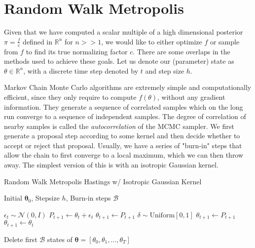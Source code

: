 \section{Random Walk Metropolis}

    Given that we have computed a scalar multiple of a high dimensional posterior $\pi = \frac{f}{c}$ defined in $\mathbb{R}^n$ for $n >> 1$, we would like to either optimize $f$ or sample from $f$ to find its true normalizing factor $c$. There are some overlaps in the methods used to achieve these goals. Let us denote our (parameter) state as $\theta \in \mathbb{R}^n$, with a discrete time step denoted by $t$ and step size $h$. 

    Markov Chain Monte Carlo algorithms are extremely simple and computationally efficient, since they only require to compute $f(\theta)$, without any gradient information. They generate a sequence of correlated samples which on the long run converge to a sequence of independent samples. The degree of correlation of nearby samples is called the \textit{autocorrelation} of the MCMC sampler. We first generate a proposal step according to some kernel and then decide whether to accept or reject that proposal. Usually, we have a series of "burn-in" steps that allow the chain to first converge to a local maximum, which we can then throw away. The simplest version of this is with an isotropic Gaussian kernel. 

    \begin{algorithm}
      \caption{Random Walk Metropolis Hastings w/ Isotropic Gaussian Kernel}\label{alg:metropolis_gaussian}
      \begin{algorithmic}

      \Require Initial $\boldsymbol{\theta}_0$, Stepsize $h$, Burn-in steps $\mathcal{B}$

          \State $\epsilon_t \sim \mathcal{N}(0, I)$ 
          \State $P_{t+1} \gets \theta_t + \epsilon_t$
              \State $\theta_{t+1} \gets P_{t+1}$ 
          \Else
              \State $\delta \sim \mathrm{Uniform}[0, 1]$
                  \State $\theta_{t+1} \gets P_{t+1}$ 
              \Else 
                  \State $\theta_{t+1} \gets \theta_t$
              \EndIf
          \EndIf
      \EndFor

      \State Delete first $\mathcal{B}$ states of $\boldsymbol{\theta} = [\theta_0, \theta_1, \ldots, \theta_T]$

      \end{algorithmic}
    \end{algorithm}

